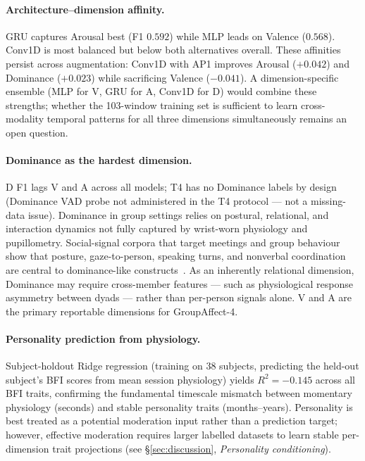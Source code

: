 \documentclass[sigconf,review,anonymous]{acmart}
\begin{document}
\paragraph{Architecture--dimension affinity.}
GRU captures Arousal best (F1 $0.592$) while MLP leads on Valence ($0.568$).
Conv1D is most balanced but below both alternatives overall.
These affinities persist across augmentation: Conv1D with AP1 improves Arousal
($+0.042$) and Dominance ($+0.023$) while sacrificing Valence ($-0.041$).
A dimension-specific ensemble (MLP for V, GRU for A, Conv1D for D) would
combine these strengths; whether the 103-window training set is sufficient
to learn cross-modality temporal patterns for all three dimensions simultaneously
remains an open question.

\paragraph{Dominance as the hardest dimension.}
D F1 lags V and A across all models; T4 has no Dominance labels by design
(Dominance VAD probe not administered in the T4 protocol --- not a missing-data
issue).
Dominance in group settings relies on postural, relational, and interaction
dynamics not fully captured by wrist-worn physiology and pupillometry.
Social-signal corpora that target meetings and group behaviour show that
posture, gaze-to-person, speaking turns, and nonverbal coordination are
central to dominance-like constructs~\cite{sanchez2012emergent,mccowan2005ami,
alameda2015salsa}.
As an inherently relational dimension, Dominance may
require cross-member features --- such as physiological response asymmetry
between dyads --- rather than per-person signals alone.
V and A are the primary reportable dimensions for GroupAffect-4.

\paragraph{Personality prediction from physiology.}
Subject-holdout Ridge regression (training on 38 subjects, predicting
the held-out subject's BFI scores from mean session physiology) yields
$R^2 = -0.145$ across all BFI traits, confirming the fundamental timescale
mismatch between momentary physiology (seconds) and stable personality
traits (months--years).
Personality is best treated as a potential moderation input rather than
a prediction target; however, effective moderation requires larger labelled
datasets to learn stable per-dimension trait projections
(see §\ref{sec:discussion}, \textit{Personality conditioning}).
\end{document}
